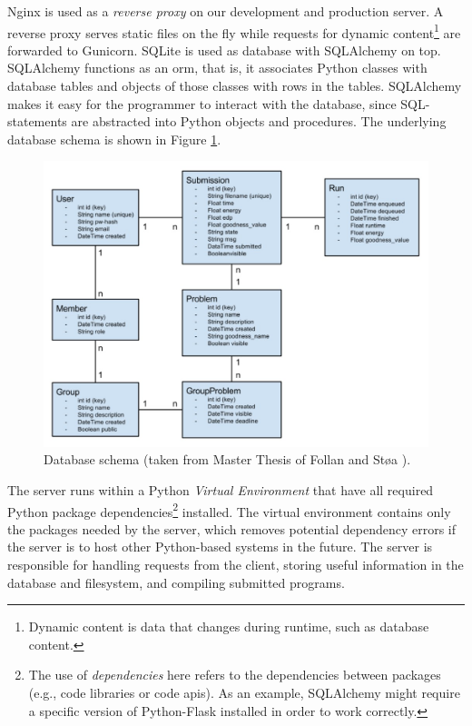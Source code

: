 Nginx \cite{NGINX} is used as a \textit{reverse proxy} on our development and production server. A reverse proxy serves static files on the fly while requests for dynamic content\footnote{Dynamic content is data that changes during runtime, such as database content.} are forwarded to Gunicorn. SQLite \cite{SQLITE} is used as database with SQLAlchemy \cite{SQLALCHEMY} on top. SQLAlchemy functions as an \gls{orm}, that is, it associates Python classes with database tables and objects of those classes with rows in the tables. SQLAlchemy makes it easy for the programmer to interact with the database, since SQL-statements are abstracted into Python objects and procedures. The underlying database schema is shown in Figure \ref{fig:old-database-schema}.\\

\begin{figure}
  \centering
  \includegraphics[width=1.0\textwidth]{figs/old_database_schema.jpg}
  \caption[Database schema.]{Database schema (taken from Master Thesis of Follan and Støa \cite{mt:T&S}).}
  \label{fig:old-database-schema}
\end{figure}

The server runs within a Python \textit{Virtual Environment} \cite{VIRTUALENV} that have all required Python package dependencies\footnote{The use of \textit{dependencies} here refers to the dependencies between packages (e.g., code libraries or code \gls{api}s). As an example, SQLAlchemy might require a specific version of Python-Flask installed in order to work correctly.} installed. The virtual environment contains only the packages needed by the server, which removes potential dependency errors if the server is to host other Python-based systems in the future. The server is responsible for handling requests from the client, storing useful information in the database and filesystem, and compiling submitted programs. \\


